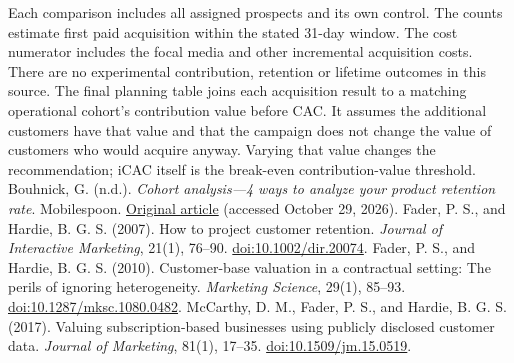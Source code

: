 \documentclass[10pt]{article}
\begin{document}
Each comparison includes all assigned prospects and its own control. The counts estimate first paid acquisition within the stated 31-day window. The cost numerator includes the focal media and other incremental acquisition costs. There are no experimental contribution, retention or lifetime outcomes in this source.
The final planning table joins each acquisition result to a matching operational cohort's contribution value before CAC. It assumes the additional customers have that value and that the campaign does not change the value of customers who would acquire anyway. Varying that value changes the recommendation; iCAC itself is the break-even contribution-value threshold.
\NewPage
{}
\hypertarget{ref:bouhnick}{}
Bouhnick, G. (n.d.). \textit{Cohort analysis---4 ways to analyze your product retention rate}. Mobilespoon. \href{https://www.mobilespoon.net/2019/07/cohort-analysis-retention-rate.html}{Original article} (accessed October 29, 2026).
\hypertarget{ref:fader2007}{}
Fader, P. S., and Hardie, B. G. S. (2007). How to project customer retention. \textit{Journal of Interactive Marketing}, 21(1), 76--90. \href{https://doi.org/10.1002/dir.20074}{doi:10.1002/dir.20074}.
\hypertarget{ref:fader2010}{}
Fader, P. S., and Hardie, B. G. S. (2010). Customer-base valuation in a contractual setting: The perils of ignoring heterogeneity. \textit{Marketing Science}, 29(1), 85--93. \href{https://doi.org/10.1287/mksc.1080.0482}{doi:10.1287/mksc.1080.0482}.
\hypertarget{ref:mccarthy2017}{}
McCarthy, D. M., Fader, P. S., and Hardie, B. G. S. (2017). Valuing subscription-based businesses using publicly disclosed customer data. \textit{Journal of Marketing}, 81(1), 17--35. \href{https://doi.org/10.1509/jm.15.0519}{doi:10.1509/jm.15.0519}.
\end{document}
